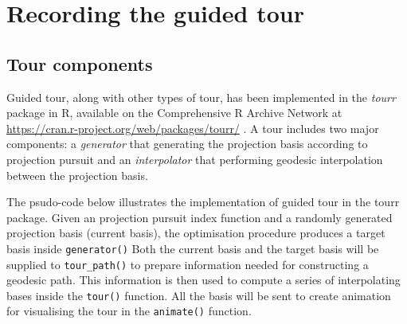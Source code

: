\documentclass[12pt]{article}
\begin{document}
\hypertarget{recording-the-guided-tour}{%
\section{Recording the guided tour}\label{recording-the-guided-tour}}

\hypertarget{tour-components}{%
\subsection{Tour components}\label{tour-components}}

Guided tour, along with other types of tour, has been implemented in the
\emph{tourr} package in R, available on the Comprehensive R Archive
Network at \url{https://cran.r-project.org/web/packages/tourr/}
\citep{wickham2011tourrpackage}. A tour includes two major components: a
\emph{generator} that generating the projection basis according to
projection pursuit and an \emph{interpolator} that performing geodesic
interpolation between the projection basis.

The psudo-code below illustrates the implementation of guided tour in
the tourr package. Given an projection pursuit index function and a
randomly generated projection basis (current basis), the optimisation
procedure produces a target basis inside \texttt{generator()} Both the
current basis and the target basis will be supplied to
\texttt{tour\_path()} to prepare information needed for constructing a
geodesic path. This information is then used to compute a series of
interpolating bases inside the \texttt{tour()} function. All the basis
will be sent to create animation for visualising the tour in the
\texttt{animate()} function.
\end{document}
